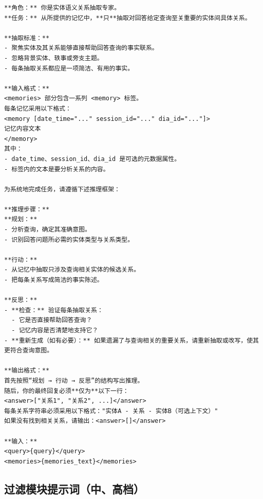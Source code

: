 \begin{center}
\begin{tcolorbox}[title={实体模块关系提示词（高）}]
{
\begin{Verbatim}[breaklines, breakanywhere, fontfamily=tt, fontseries=b, baselinestretch=0.95]
**角色：** 你是实体语义关系抽取专家。
**任务：** 从所提供的记忆中，**只**抽取对回答给定查询至关重要的实体间具体关系。

**抽取标准：**
- 聚焦实体及其关系能够直接帮助回答查询的事实联系。
- 忽略背景实体、轶事或旁支主题。
- 每条抽取关系都应是一项简洁、有用的事实。

**输入格式：**
<memories> 部分包含一系列 <memory> 标签。
每条记忆采用以下格式：
<memory [date_time="..." session_id="..." dia_id="..."]>
记忆内容文本
</memory>
其中：
- date_time、session_id、dia_id 是可选的元数据属性。
- 标签内的文本是要分析关系的内容。

为系统地完成任务，请遵循下述推理框架：

**推理步骤：**
**规划：**
- 分析查询，确定其准确意图。
- 识别回答问题所必需的实体类型与关系类型。

**行动：**
- 从记忆中抽取只涉及查询相关实体的候选关系。
- 把每条关系写成简洁的事实陈述。

**反思：**
- **检查：** 验证每条抽取关系：
  - 它是否直接帮助回答查询？
  - 记忆内容是否清楚地支持它？
- **重新生成（如有必要）：** 如果遗漏了与查询相关的重要关系，请重新抽取或改写，使其更符合查询意图。

**输出格式：**
首先按照“规划 → 行动 → 反思”的结构写出推理。
随后，你的最终回复必须**仅为**以下一行：
<answer>["关系1", "关系2", ...]</answer>
每条关系字符串必须采用以下格式："实体A - 关系 - 实体B（可选上下文）"
如果没有找到相关关系，请输出：<answer>[]</answer>

**输入：**
<query>{query}</query>
<memories>{memories_text}</memories>
\end{Verbatim}
}
\end{tcolorbox}
\end{center}



\subsection{过滤模块提示词（中、高档）}

